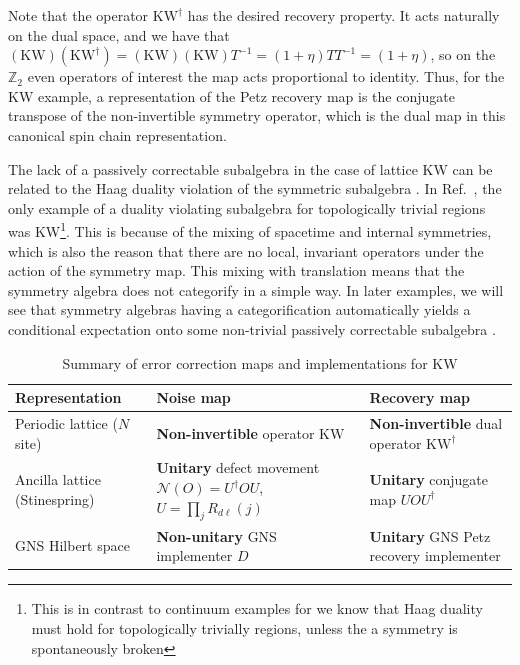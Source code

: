 \documentclass{article}
\theoremstyle{definition}
\begin{document}
  Note that the operator $\textrm{KW}^{\dagger}$ has the desired recovery
  property. It acts naturally on the dual space, and we have that
  $(\text{KW})(\text{KW}^{\dagger}) = (\text{KW})(\text{KW})T^{-1}= (1+\eta)TT^{-1}
  = (1+\eta)$, so on the $\mathbb{Z}_{2}$ even operators of interest the map acts
  \color{blue}
  proportional to
  \color{black}
  identity. Thus, for the KW example, a representation of the Petz recovery map
  is the conjugate transpose of the non-invertible symmetry operator, which is the
  dual map in this canonical spin chain representation.

  The lack of a passively correctable subalgebra in the case of lattice KW can be
  related to the Haag duality violation of the symmetric subalgebra \cite{shao2025additivityhaagdualitynoninvertible}.
  In Ref.~\cite{shao2025additivityhaagdualitynoninvertible}, the only example of
  a duality violating subalgebra for topologically trivial regions was KW\footnote{This
  is in contrast to continuum examples for we know that Haag duality must hold
  for topologically trivially regions, unless the a symmetry is spontaneously broken\cite{halvorson2006algebraicquantumfieldtheory}}.
  This is because of the mixing of spacetime and internal symmetries, which is also
  the reason that there are no local, invariant operators under the action of
  the symmetry map. This mixing with translation means that the symmetry algebra
  does not categorify in a simple way. In later examples, we will see that symmetry algebras having
  a categorification automatically yields a conditional expectation onto some non-trivial
  passively correctable subalgebra \cite{wang2025manyfacesofnis}.

\begin{table}[t]
  \caption{Summary of error correction maps and implementations for KW}
  \label{tab:kw-summary}
  \centering
  \scriptsize
  \setlength{\tabcolsep}{4pt}
  \renewcommand{\arraystretch}{1.05}
  \begin{tabularx}{\textwidth}{lXX}
    \toprule
    \textbf{Representation} & \textbf{Noise map} & \textbf{Recovery map} \\
    \midrule
    Periodic lattice ($N$ site) &
    \textbf{Non-invertible} operator $\textrm{KW}$ &
    \textbf{Non-invertible} dual operator $\textrm{KW}^{\dagger}$ \\
    
    Ancilla lattice (Stinespring) &
    \textbf{Unitary} defect movement $\mathcal{N}(O)=U^{\dagger}OU$, $U=\prod_{j}R_{d\ell}(j)$ &
    \textbf{Unitary} conjugate map $UOU^{\dagger}$ \\
    
    GNS Hilbert space &
    \textbf{Non-unitary} GNS implementer $D$ &
    \textbf{Unitary} GNS Petz recovery implementer \\
    \bottomrule
  \end{tabularx}
\end{table}
\end{document}
